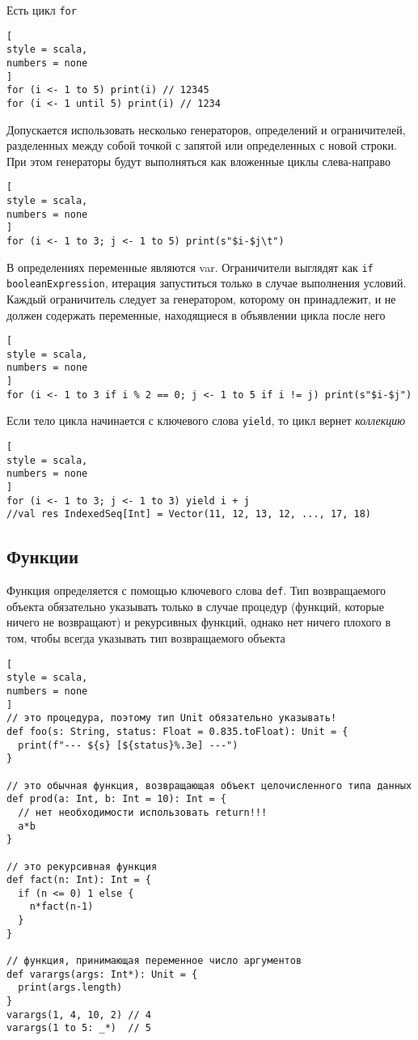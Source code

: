 \documentclass[%
	11pt,
	a4paper,
	utf8,
		]{article}
\begin{document}
Есть цикл \texttt{for}
\begin{lstlisting}[
style = scala,
numbers = none
]
for (i <- 1 to 5) print(i) // 12345
for (i <- 1 until 5) print(i) // 1234
\end{lstlisting}

Допускается использовать несколько генераторов, определений и ограничителей, разделенных между собой точкой с запятой или определенных с новой строки. При этом генераторы будут выполняться как вложенные циклы слева-направо
\begin{lstlisting}[
style = scala,
numbers = none
]
for (i <- 1 to 3; j <- 1 to 5) print(s"$i-$j\t")
\end{lstlisting}

В определениях переменные являются var. Ограничители выглядят как \texttt{if booleanExpression}, итерация запуститься только в случае выполнения условий. Каждый ограничитель следует за генератором, которому он принадлежит, и не должен содержать переменные, находящиеся в объявлении цикла после него
\begin{lstlisting}[
style = scala,
numbers = none
]
for (i <- 1 to 3 if i % 2 == 0; j <- 1 to 5 if i != j) print(s"$i-$j")
\end{lstlisting}

Если тело цикла начинается с ключевого слова \texttt{yield}, то цикл вернет \emph{коллекцию}
\begin{lstlisting}[
style = scala,
numbers = none
]
for (i <- 1 to 3; j <- 1 to 3) yield i + j
//val res IndexedSeq[Int] = Vector(11, 12, 13, 12, ..., 17, 18)
\end{lstlisting}

\subsection{Функции}

Функция определяется с помощью ключевого слова \texttt{def}. Тип возвращаемого объекта обязательно указывать только в случае процедур (функций, которые ничего не возвращают) и рекурсивных функций, однако нет ничего плохого в том, чтобы всегда указывать тип возвращаемого объекта
\begin{lstlisting}[
style = scala,
numbers = none
]
// это процедура, поэтому тип Unit обязательно указывать!
def foo(s: String, status: Float = 0.835.toFloat): Unit = {
  print(f"--- ${s} [${status}%.3e] ---")
}

// это обычная функция, возвращающая объект целочисленного типа данных
def prod(a: Int, b: Int = 10): Int = {
  // нет необходимости использовать return!!!
  a*b
}

// это рекурсивная функция
def fact(n: Int): Int = {
  if (n <= 0) 1 else {
    n*fact(n-1)
  }
}

// функция, принимающая переменное число аргументов
def varargs(args: Int*): Unit = {
  print(args.length)
}
varargs(1, 4, 10, 2) // 4
varargs(1 to 5: _*)  // 5
\end{lstlisting}
\end{document}
